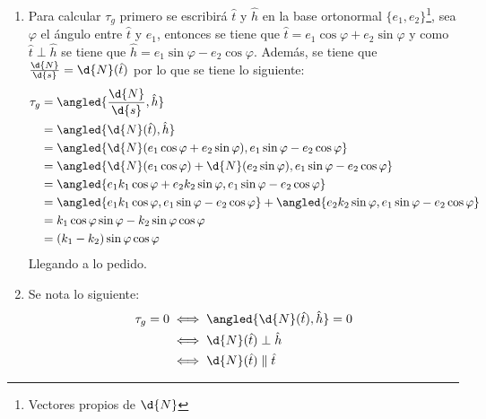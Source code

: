 \documentclass{homework}
\begin{document}
\begin{sol}
    \begin{enumerate}
        \item Para calcular \(\tau_g\) primero se escribirá \(\hat{t}\) y \(\hat{h}\) en la base ortonormal \(\{e_1,e_2\}\)\footnote{Vectores propios de \(\d{N}\)}, sea \(\varphi\) el ángulo entre \(\hat{t}\) y \(e_1\), entonces se tiene que \(\hat{t}=e_1\cos\varphi+e_2\sin\varphi\) y como \(\hat{t}\perp\hat{h}\) se tiene que \(\hat{h}=e_1\sin\varphi-e_2\cos\varphi\). Además, se tiene que \(\frac{\d{N}}{\d{s}}=\d{N}(\hat{t})\) por lo que se tiene lo siguiente:
              \begin{align*}
                  \tau_g & =\angled{\frac{\d{N}}{\d{s}},\hat{h}}                                                                              \\
                         & =\angled{\d{N}(\hat{t}),\hat{h}}                                                                                   \\
                         & =\angled{\d{N}(e_1\cos\varphi+e_2\sin\varphi),e_1\sin\varphi-e_2\cos\varphi}                                       \\
                         & =\angled{\d{N}(e_1\cos\varphi)+\d{N}(e_2\sin\varphi),e_1\sin\varphi-e_2\cos\varphi}                                \\
                         & =\angled{e_1k_1\cos\varphi+e_2k_2\sin\varphi,e_1\sin\varphi-e_2\cos\varphi}                                        \\
                         & =\angled{e_1k_1\cos\varphi,e_1\sin\varphi-e_2\cos\varphi}+\angled{e_2k_2\sin\varphi,e_1\sin\varphi-e_2\cos\varphi} \\
                         & =k_1\cos\varphi\sin\varphi-k_2\sin\varphi\cos\varphi                                                               \\
                         & =(k_1-k_2)\sin\varphi\cos\varphi
              \end{align*}
              Llegando a lo pedido.
        \item Se nota lo siguiente:
              \begin{align*}
                  \tau_g=0 & \iff \angled{\d{N}(\hat{t}),\hat{h}}=0                    \\
                           & \iff \d{N}(\hat{t})\perp\hat{h}                           \\
                           & \iff \d{N}(\hat{t})\parallel\hat{t}                       \\

\end{align*}
\end{enumerate}
\end{sol}
\end{document}
